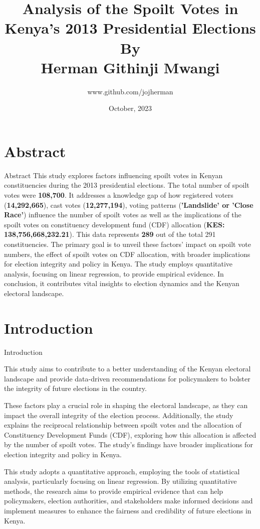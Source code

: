 \documentclass{beamer}
\title{Analysis of the Spoilt Votes in Kenya's 2013 Presidential Elections
\\By
\\Herman Githinji Mwangi}
\author{www.github.com/jojherman}
\institute[]{Junior Researcher\\Berlin, Germany}
\date{October, 2023}
\begin{document}


\begin{frame}
  \titlepage
\end{frame}

\section{Abstract}


\begin{frame}{Abstract}
  This study explores factors influencing spoilt votes in Kenyan constituencies during the 2013 presidential elections. The total number of spoilt votes were \textbf{108,700}. It addresses a knowledge gap of how registered voters (\textbf{14,292,665}), cast votes (\textbf{12,277,194}), voting patterns (\textbf{'Landslide' or 'Close Race'}) influence the number of spoilt votes as well as the implications of the spoilt votes on constituency development fund (CDF) allocation (\textbf{KES: 138,756,668,232.21}). This data represents \textbf{289} out of the total 291 constituencies. The primary goal is to unveil these factors' impact on spoilt vote numbers, the effect of spoilt votes on CDF allocation, with broader implications for election integrity and policy in Kenya. The study employs quantitative analysis, focusing on linear regression, to provide empirical evidence. In conclusion, it contributes vital insights to election dynamics and the Kenyan electoral landscape.
\end{frame}

\section{Introduction}

\begin{frame}{Introduction}

This study aims to contribute to a better understanding of the Kenyan electoral landscape and provide data-driven recommendations for policymakers to bolster the integrity of future elections in the country. 

These factors play a crucial role in shaping the electoral landscape, as they can impact the overall integrity of the election process. Additionally, the study explains the reciprocal relationship between spoilt votes and the allocation of Constituency Development Funds (CDF), exploring how this allocation is affected by the number of spoilt votes. The study's findings have broader implications for election integrity and policy in Kenya.

This study adopts a quantitative approach, employing the tools of statistical analysis, particularly focusing on linear regression. By utilizing quantitative methods, the research aims to provide empirical evidence that can help policymakers, election authorities, and stakeholders make informed decisions and implement measures to enhance the fairness and credibility of future elections in Kenya.
\end{frame}
\end{document}
